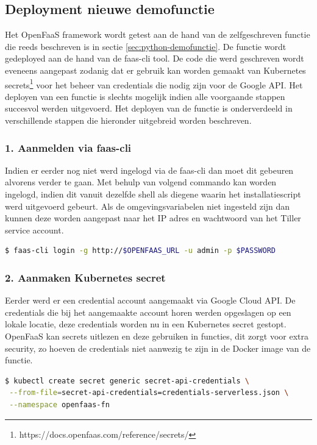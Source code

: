 \subsection{Deployment nieuwe demofunctie}
Het OpenFaaS framework wordt getest aan de hand van de zelfgeschreven functie die reeds beschreven is in sectie \ref{sec:python-demofunctie}. De functie wordt gedeployed aan de hand van de faas-cli tool. De code die werd geschreven wordt eveneens aangepast zodanig dat er gebruik kan worden gemaakt van Kubernetes secrets\footnote{https://docs.openfaas.com/reference/secrets/} voor het beheer van credentials die nodig zijn voor de Google API. Het deployen van een functie is slechts mogelijk indien alle voorgaande stappen succesvol werden uitgevoerd. Het deployen van de functie is onderverdeeld in verschillende stappen die hieronder uitgebreid worden beschreven.

\subsubsection{1. Aanmelden via faas-cli}
Indien er eerder nog niet werd ingelogd via de faas-cli dan moet dit gebeuren alvorens verder te gaan. Met behulp van volgend commando kan worden ingelogd, indien dit vanuit dezelfde shell als diegene waarin het installatiescript werd uitgevoerd gebeurt. Als de omgevingsvariabelen niet ingesteld zijn dan kunnen deze worden aangepast naar het IP adres en wachtwoord van het Tiller service account.
\begin{lstlisting}[language=bash]
$ faas-cli login -g http://$OPENFAAS_URL -u admin -p $PASSWORD
\end{lstlisting}

\subsubsection{2. Aanmaken Kubernetes secret}
Eerder werd er een credential account aangemaakt via Google Cloud API. De credentials die bij het aangemaakte account horen werden opgeslagen op een lokale locatie, deze credentials worden nu in een Kubernetes secret gestopt. OpenFaaS kan secrets uitlezen en deze gebruiken in functies, dit zorgt voor extra security, zo hoeven de credentials niet aanwezig te zijn in de Docker image van de functie.

\begin{lstlisting}[language=bash]
$ kubectl create secret generic secret-api-credentials \
 --from-file=secret-api-credentials=credentials-serverless.json \
 --namespace openfaas-fn
\end{lstlisting}

